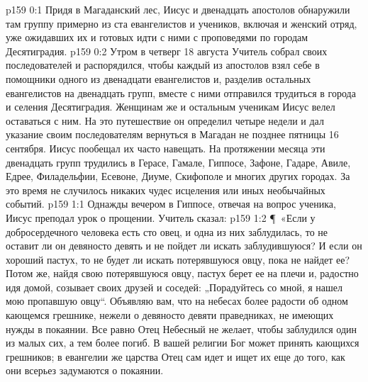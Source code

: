 \vs p159 0:1 Придя в Магаданский лес, Иисус и двенадцать апостолов обнаружили там группу примерно из ста евангелистов и учеников, включая и женский отряд, уже ожидавших их и готовых идти с ними с проповедями по городам Десятиградия.
\vs p159 0:2 Утром в четверг 18 августа Учитель собрал своих последователей и распорядился, чтобы каждый из апостолов взял себе в помощники одного из двенадцати евангелистов и, разделив остальных евангелистов на двенадцать групп, вместе с ними отправился трудиться в города и селения Десятиградия. Женщинам же и остальным ученикам Иисус велел оставаться с ним. На это путешествие он определил четыре недели и дал указание своим последователям вернуться в Магадан не позднее пятницы 16 сентября. Иисус пообещал их часто навещать. На протяжении месяца эти двенадцать групп трудились в Герасе, Гамале, Гиппосе, Зафоне, Гадаре, Авиле, Едрее, Филадельфии, Есевоне, Диуме, Скифополе и многих других городах. За это время не случилось никаких чудес исцеления или иных необычайных событий.
\vs p159 1:1 Однажды вечером в Гиппосе, отвечая на вопрос ученика, Иисус преподал урок о прощении. Учитель сказал:
\vs p159 1:2 \P\ «Если у добросердечного человека есть сто овец, и одна из них заблудилась, то не оставит ли он девяносто девять и не пойдет ли искать заблудившуюся? И если он хороший пастух, то не будет ли искать потерявшуюся овцу, пока не найдет ее? Потом же, найдя свою потерявшуюся овцу, пастух берет ее на плечи и, радостно идя домой, созывает своих друзей и соседей: „Порадуйтесь со мной, я нашел мою пропавшую овцу“. Объявляю вам, что на небесах более радости об одном кающемся грешнике, нежели о девяносто девяти праведниках, не имеющих нужды в покаянии. Все равно Отец Небесный не желает, чтобы заблудился один из малых сих, а тем более погиб. В вашей религии Бог может принять кающихся грешников; в евангелии же царства Отец сам идет и ищет их еще до того, как они всерьез задумаются о покаянии.
